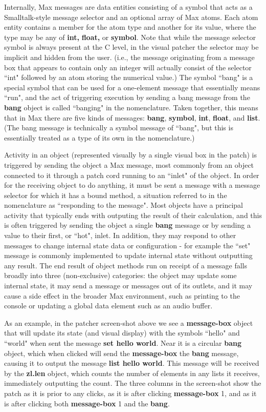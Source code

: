 \documentclass[acmsmall]{acmart}
\begin{document}
Internally, Max messages are data entities consisting of a symbol that acts
as a Smalltalk-style message selector and an optional array of Max atoms. 
Each atom entity contains a member for the atom type and another for its value, 
where the type may be any of \textbf{int,} \textbf{float,} or \textbf{symbol}. 
Note that while the message selector symbol is always present at the C level,
in the visual patcher the selector may be implicit and hidden from the user. 
(i.e., the message originating from a message box that appears to contain only an integer
will actually consist of the selector ``int" followed by an atom storing the numerical value.)
The symbol ``bang" is a special symbol that can be used for a one-element message 
that essentially means ``run", and the act of triggering execution by sending a bang
message from the \textbf{bang} object is called ``banging" in the nomenclature.
Taken together, this means that in Max there are five kinds of messages: 
\textbf{bang}, \textbf{symbol}, \textbf{int}, \textbf{float}, and \textbf{list}. 
(The bang message is technically a symbol message
of ``bang", but this is essentially treated as a type of its own in the nomenclature.) 
\cite{Puckette2002}

Activity in an object (represented visually by a single visual box in the patch) is triggered
by sending the object a Max message, most commonly from an object connected to it
through a patch cord running to an ``inlet" of the object. 
In order for the receiving object to do anything, it must 
be sent a message with a message selector for which it has a bound method,
a situation referred to in the nomenclature as ``responding to the message". Most objects
have a principal activity that typically ends with outputing the result of their calculation, and this is
often triggered by sending the object a single \textbf{bang} message or by sending a value to 
their first, or ``hot", inlet. In addition, they may respond to other messages to change internal state
data or configuration - for example the ``set" message is commonly implemented to update internal
state without outputting any result. The end result of object methods run on receipt of a message falls broadly
into three (non-exclusive) categories: the object may update some internal state, it may send a
message or messages out of its outlets, and it may cause a side effect in the broader
Max environment, such as printing to the console or updating a global data element such as
an audio buffer.

As an example, in the patcher screen-shot above we see a \textbf{message-box} object that will update
its state (and visual display) with the symbols ``hello" and ``world" when sent the message 
\textbf{set hello world}. Near it is a circular \textbf{bang} object, which when clicked will send the
\textbf{message-box} the \textbf{bang} message, causing it to output the message \textbf{list hello world}.
This message will be received by the \textbf{zl.len} object, which counts the number of elements 
in any lists it receives, immediately outputting the count. The three columns in the screen-shot
show the patch as it is prior to any clicks, as it is after clicking \textbf{message-box} 1,
and as it is after clicking both \textbf{message-box} 1 and the \textbf{bang}.
\end{document}
